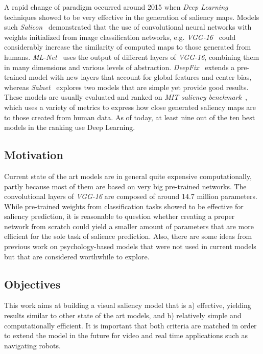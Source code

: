 \documentclass[10pt,twocolumn,letterpaper]{article}
\begin{document}
A rapid change of paradigm occurred around 2015 when \emph{Deep Learning}
techniques showed to be very effective in the generation of saliency
maps.
Models such \emph{Salicon}~\cite{jiang_2015} demonstrated that the use of 
convolutional neural networks with weights initialized from
image classification networks, e.g. \emph{VGG-16}~\cite{zisserman_2014}
could considerably increase the similarity of computed maps to those
generated from humans.
\emph{ML-Net}~\cite{cornia_2016} uses the output of different layers
of \emph{VGG-16}, combining them in many dimensions and various levels of
abstraction.
\emph{DeepFix}~\cite{kruthiventi_2015} extends a pre-trained model with
new layers that account for global features and center bias,
whereas \emph{Salnet}~\cite{pan_2016} explores two models that are
simple yet provide good results.
These models are usually evaluated and ranked on
\emph{MIT saliency benchmark}~\cite{mit_sal_bm}, which uses a variety of
metrics to express how close generated saliency maps are to those created
from human data.
As of today, at least nine out of the ten best models in the ranking use
Deep Learning.

\subsection{Motivation}
Current state of the art models are in general quite expensive computationally,
partly because most of them are based on very big pre-trained networks.
The convolutional layers of \emph{VGG-16} are composed of around 14.7
million parameters.
While pre-trained weights from classification tasks showed to be effective
for saliency prediction, it is reasonable to question whether
creating a proper network from scratch could yield a smaller amount of
parameters that are more efficient for the sole task of salience prediction.
Also, there are some ideas from previous work on psychology-based models that were not
used in current models but that are considered worthwhile to explore.

\subsection{Objectives}
This work aims at building a visual saliency model that is a) effective,
yielding results similar to other state of the art models,
and b) relatively simple and computationally efficient.
It is important that both criteria are matched in order to extend the
model in the future for video and real time applications such as
navigating robots.
\end{document}
